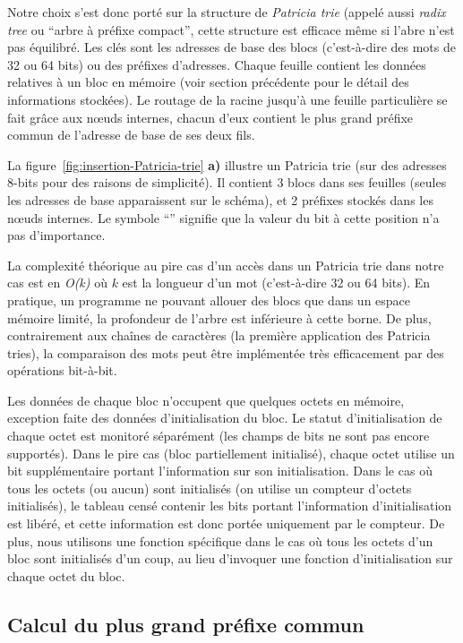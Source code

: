 Notre choix s'est donc porté sur la structure de {\em Patricia trie}
\cite{Szpankowski/90} (appelé aussi {\em radix tree} ou ``arbre à préfixe
compact'', cette structure est efficace même si l'abre n'est pas équilibré.
Les clés sont les adresses de base des blocs (c'est-à-dire des mots de 32 ou 64
bits) ou des préfixes d'adresses.
Chaque feuille contient les données relatives à un bloc en mémoire (voir
section précédente pour le détail des informations stockées).
Le routage de la racine jusqu'à une feuille particulière se fait grâce aux
n\oe{}uds internes, chacun d'eux contient le plus grand préfixe commun de
l'adresse de base de ses deux fils.

La figure~\ref{fig:insertion-Patricia-trie} \textbf{a)} illustre un Patricia
trie (sur des adresses 8-bits pour des raisons de simplicité).
Il contient 3 blocs dans ses feuilles (seules les adresses de base apparaissent
sur le schéma), et 2 préfixes stockés dans les n\oe{}uds internes.
Le symbole ``{\tt *}'' signifie que la valeur du bit à cette position n'a pas
d'importance.

La complexité théorique au pire cas d'un accès dans un Patricia trie dans notre
cas est en {\em O(k)} où $k$ est la longueur d'un mot (c'est-à-dire 32 ou 64
bits). En pratique, un programme ne pouvant allouer des blocs que dans un
espace mémoire limité, la profondeur de l'arbre est inférieure à cette borne.
De plus, contrairement aux chaînes de caractères (la première application des
Patricia tries), la comparaison des mots peut être implémentée très
efficacement par des opérations bit-à-bit.

Les données de chaque bloc n'occupent que quelques octets en mémoire, exception
faite des données d'initialisation du bloc.
Le statut d'initialisation de chaque octet est monitoré séparément (les champs
de bits ne sont pas encore supportés).
Dans le pire cas (bloc partiellement initialisé), chaque octet utilise un bit
supplémentaire portant l'information sur son initialisation.
Dans le cas où tous les octets (ou aucun) sont initialisés (on utilise un
compteur d'octets initialisés), le tableau censé contenir les bits portant
l'information d'initialisation est libéré, et cette information est donc portée
uniquement par le compteur.
De plus, nous utilisons une fonction spécifique dans le cas où tous les octets
d'un bloc sont initialisés d'un coup, au lieu d'invoquer une fonction
d'initialisation sur chaque octet du bloc.


\subsection{Calcul du plus grand préfixe commun}


